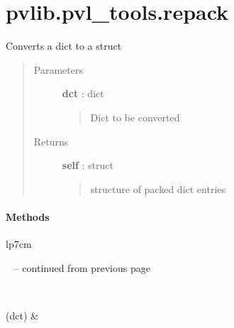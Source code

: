 \documentclass[letterpaper,10pt,english]{sphinxmanual}
\begin{document}
\section{pvlib.pvl\_tools.repack}
\label{stubs/pvlib.pvl_tools.repack:pvlib-pvl-tools-repack}\label{stubs/pvlib.pvl_tools.repack::doc}

\begin{fulllineitems}
\label{stubs/pvlib.pvl_tools.repack:pvlib.pvl_tools.repack}
Converts a dict to a struct
\begin{quote}\begin{description}
\item[{Parameters}] \leavevmode
\textbf{dct} : dict
\begin{quote}

Dict to be converted
\end{quote}

\item[{Returns}] \leavevmode
\textbf{self} : struct
\begin{quote}

structure of packed dict entries
\end{quote}

\end{description}\end{quote}

\begin{fulllineitems}
\label{stubs/pvlib.pvl_tools.repack:pvlib.pvl_tools.repack.__init__}
\end{fulllineitems}

\paragraph{Methods}

\begin{longtable}{lp{7cm}}
\hline
\endfirsthead

%
{{\textsf{\tablename\ \thetable{} -- continued from previous page}}} \\
\hline
\endhead

\hline {} \\ \hline
\endfoot

\endlastfoot


{\hyperref[stubs/pvlib.pvl_tools.repack:pvlib.pvl_tools.repack.__init__]{}}(dct)
 & 

\\
\hline\end{longtable}


\end{fulllineitems}
\end{document}
